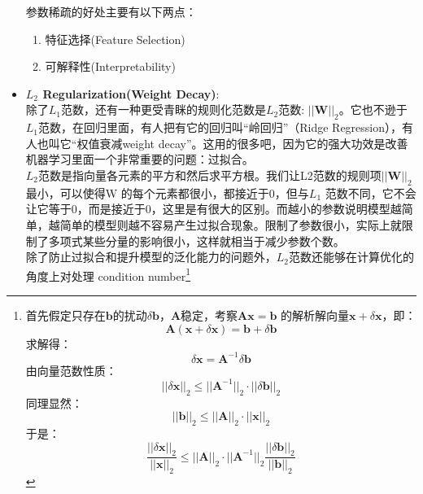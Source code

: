 \documentclass[11pt,fleqn, UTF8]{ctexbook} %
\begin{document}
\begin{itemize}
\begin{equation*}
  \end{equation*}
  参数稀疏的好处主要有以下两点：
  \begin{enumerate}
    \item 特征选择(Feature Selection)
    \item 可解释性(Interpretability)
  \end{enumerate}
  \item \textbf{$L_2$ Regularization(Weight Decay)}:\\
  除了$L_1$范数，还有一种更受青眯的规则化范数是$L_2$范数: $||\boldsymbol{W}||_2$。它也不逊于$L_1$范数，在回归里面，有人把有它的回归叫“岭回归”（Ridge Regression），有人也叫它“权值衰减weight decay”。这用的很多吧，因为它的强大功效是改善机器学习里面一个非常重要的问题：过拟合。\\
  $L_2$范数是指向量各元素的平方和然后求平方根。我们让L2范数的规则项$||\boldsymbol{W}||_2$ 最小，可以使得W 的每个元素都很小，都接近于0，但与$L_1$ 范数不同，它不会让它等于0，而是接近于0，这里是有很大的区别。而越小的参数说明模型越简单，越简单的模型则越不容易产生过拟合现象。限制了参数很小，实际上就限制了多项式某些分量的影响很小，这样就相当于减少参数个数。\\
  除了防止过拟合和提升模型的泛化能力的问题外，$L_2$范数还能够在计算优化的角度上对处理 condition number\footnote{
  首先假定只存在$\boldsymbol{b}$的扰动$\delta\boldsymbol{b}$，$\boldsymbol{A}$稳定，考察$\boldsymbol{A}\boldsymbol{x}=\boldsymbol{b}$ 的解析解向量$\boldsymbol{x}+\delta\boldsymbol{x}$，即：
  \begin{equation*}
    \boldsymbol{A}(\boldsymbol{x}+\delta\boldsymbol{x})=\boldsymbol{b}+\delta\boldsymbol{b}
  \end{equation*}
  求解得：
  \begin{equation*}
    \delta\boldsymbol{x}=\boldsymbol{A}^{-1}\delta\boldsymbol{b}
  \end{equation*}
  由向量范数性质：
  \begin{equation*}
    ||\delta\boldsymbol{x}||_2\leq||\boldsymbol{A}^{-1}||_2\cdot||\delta\boldsymbol{b}||_2
  \end{equation*}
  同理显然：
  \begin{equation*}
    ||\boldsymbol{b}||_2\leq||\boldsymbol{A}||_2\cdot||\boldsymbol{x}||_2
  \end{equation*}
  于是：
  \begin{equation*}
    \frac{||\delta\boldsymbol{x}||_2}{||\boldsymbol{x}||_2}\leq||\boldsymbol{A}||_2\cdot||\boldsymbol{A}^{-1}||_2\frac{||\delta\boldsymbol{b}||_2}{||\boldsymbol{b}||_2}
  \end{equation*}

}
\end{itemize}
\end{document}
